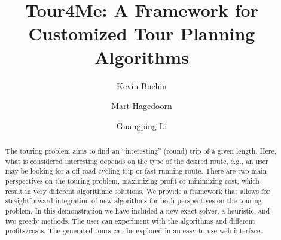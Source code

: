 \documentclass[sigconf,natbib=false]{acmart}
\begin{document}
\title{Tour4Me: A Framework for Customized Tour Planning Algorithms}


\author{Kevin Buchin}

\author{Mart Hagedoorn}

\author{Guangping Li}

\renewcommand{\shortauthors}{Buchin, Hagedoorn, and Li}
\newcommand{\tM}{\textsc{Tour4Me}\xspace}

\begin{abstract}
The touring problem aims to find an ``interesting'' (round) trip of a given length. Here, what is considered interesting depends on the type of the desired route, e.g., an user may be looking for a off-road cycling trip or fast running route.
There are two main perspectives on the touring problem, maximizing profit or minimizing cost, which result in very different algorithmic solutions. We provide a framework that allows for straightforward integration of new algorithms for both perspectives on the touring problem.
In this demonstration we have included a new exact solver, a heuristic, and two greedy methods. The user can experiment with the algorithms and different profits/costs. The generated tours can be explored in an easy-to-use web interface.
\end{abstract}
\end{document}
